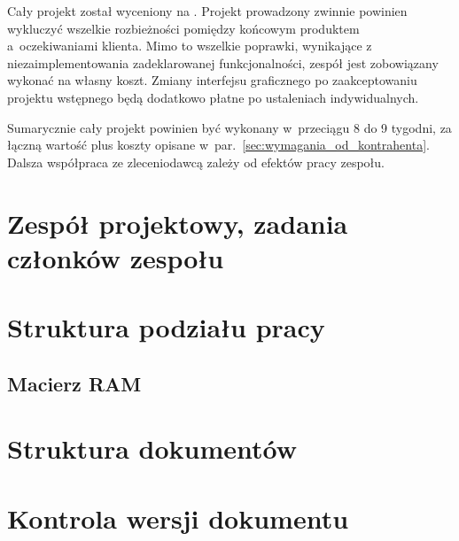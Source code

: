 \documentclass[10pt,a4paper]{article}
\begin{document}
Cały projekt został wyceniony na . Projekt prowadzony zwinnie
powinien wykluczyć wszelkie rozbieżności pomiędzy końcowym produktem
a~oczekiwaniami klienta. Mimo to wszelkie poprawki, wynikające z
niezaimplementowania zadeklarowanej funkcjonalności, zespół jest zobowiązany
wykonać na własny koszt. Zmiany interfejsu graficznego po zaakceptowaniu
projektu wstępnego będą dodatkowo płatne po ustaleniach indywidualnych.

Sumarycznie cały projekt powinien być wykonany w~przeciągu 8 do 9 tygodni, za
łączną wartość  plus koszty opisane
w~par.~\ref{sec:wymagania_od_kontrahenta}. Dalsza współpraca ze zleceniodawcą
zależy od efektów pracy zespołu.

\section{Zespół projektowy, zadania członków zespołu}

\section{Struktura podziału pracy}
\subsection{Macierz RAM}

\section{Struktura dokumentów}

\section{Kontrola wersji dokumentu}
\end{document}
